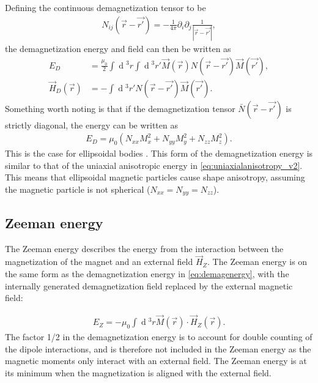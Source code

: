 \documentclass[12pt, a4paper]{article}		%
\renewcommand{\d}[1]{\ensuremath{\operatorname{d}\!{#1}}}
\numberwithin{equation}{section}
\begin{document}
Defining the continuous demagnetization tensor to be
\begin{align}
N_{ij}(\vec{r}-\vec{r'}) = -\frac{1}{4\pi}\partial_i\partial_j \frac{1}{|\vec{r}-\vec{r'}|},
\end{align}
the demagnetization energy and field can then be written as
\begin{align}
E_D &= \frac{\mu_0}{2} \int \d {^3}r \int \d {^3}r' \vec{M}(\vec{r}) N(\vec{r}-\vec{r'})\vec{M}(\vec{r'}), \\
\vec{H}_D(\vec{r}) &= - \int \d {^3}r' N(\vec{r}-\vec{r'})\vec{M}(\vec{r'}).
\end{align}
Something worth noting is that if the demagnetization tensor $\bar{N}(\vec{r}-\vec{r'})$ is strictly diagonal, the energy can be written as
\begin{align}
E_D = \mu_0(N_{xx}M_x^2+N_{yy}M_y^2+N_{zz}M_z^2).
\end{align}
This is the case for ellipsoidal bodies \cite{kruger2006current}. This form of the demagnetization energy is similar to that of the uniaxial anisotropic energy in \eqref{eq:uniaxialanisotropy_v2}. This means that ellipsoidal magnetic particles cause shape anisotropy, assuming the magnetic particle is not spherical ($N_{xx} = N_{yy} = N_{zz}$).


\subsection{Zeeman energy}
The Zeeman energy describes the energy from the interaction between the magnetization of the magnet and an external field $\vec{H}_{Z}$. The Zeeman energy is on the same form as the demagnetization energy in \eqref{eq:demagenergy}, with the internally generated demagnetization field replaced by the external magnetic field:

\begin{align}
\label{eq:zeemanenergy}
E_Z = -\mu_0\int \d {^3}r \vec{M}(\vec{r})\cdot\vec{H}_{Z}(\vec{r}).
\end{align}
The factor 1/2 in the demagnetization energy is to account for double counting of the dipole interactions, and is therefore not included in the Zeeman energy as the magnetic moments only interact with an external field. The Zeeman energy is at its minimum when the magnetization is aligned with the external field.
\end{document}
